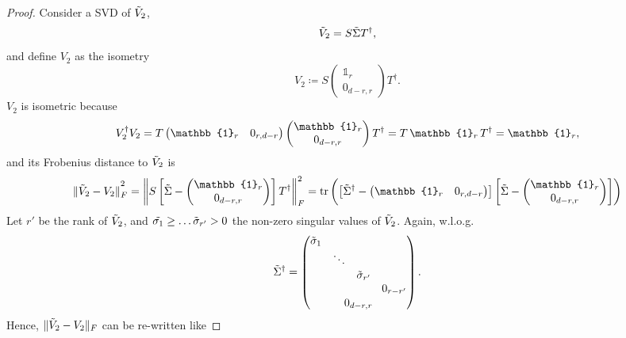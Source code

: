 \begin{proof}
Consider a SVD of $\Tilde{V}_2$,
\begin{equation*}
\Tilde{V}_2 = S\Tilde{\Sigma}T^{\dag},
\end{equation*} and define $V_2$ as the isometry
\begin{equation*}
V_2\coloneqq S \begin{pmatrix} \mathbb{1}_r \\ 0_{d-r,r} \end{pmatrix} T^{\dag}.
\end{equation*} $V_2$ is isometric because
\begin{equation*}
V_2^{\dag}V_2=T\begin{pmatrix} \mathbb{1}_r & 0_{r,d-r} \end{pmatrix} \begin{pmatrix} \mathbb{1}_r \\ 0_{d-r,r} \end{pmatrix} T^{\dag}=T\thinspace \mathbb{1}_r \thinspace T^{\dag} = \mathbb{1}_r,
\end{equation*}
and its Frobenius distance to $\Tilde{V}_2$ is
\begin{equation*}
\|\Tilde{V}_2-V_2\|_F^{\textstyle ^2} = \left\|S\left[\Tilde{\Sigma}-\begin{pmatrix}
\mathbb{1}_r \\ 0_{d-r,r}\end{pmatrix}\right]T^{\dag}\right\|_F^2=\operatorname{tr}\left(\left[\Tilde{\Sigma}^{\dag}-\begin{pmatrix} \mathbb{1}_r & 0_{r,d-r}\end{pmatrix}\right]\left[\Tilde{\Sigma}-\begin{pmatrix} \mathbb{1}_r \\ 0_{d-r,r}\end{pmatrix}\right]\right)
\end{equation*}
Let $r'$ be the rank of $\Tilde{V}_2$, and $\Tilde{\sigma_1}\geq\dots\Tilde{\sigma}_{r'}>0$ the non-zero singular values of $\Tilde{V}_2$. Again, w.l.o.g.\
\begin{equation*}
\Tilde{\Sigma}^{\dag}=
\begin{pmatrix}
\Tilde{\sigma}_1 &&& \\
&\ddots&& \\
&&\Tilde{\sigma}_{r'}& \\
&&&0_{r-r'}\\[0.1em]
\multicolumn{4}{c}{0_{d-r,r}}
\end{pmatrix}.
\end{equation*}
Hence, $\|\Tilde{V}_2-V_2\|_F$ can be re-written like

\end{proof}
